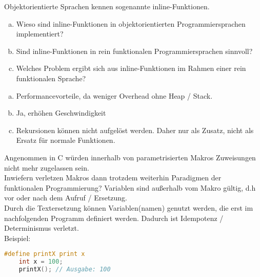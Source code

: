 \begin{card}
	Objektorientierte Sprachen kennen sogenannte inline-Funktionen.
	\begin{enumerate}[a)]
	\item Wieso sind inline-Funktionen in objektorientierten Programmiersprachen implementiert?
	\item Sind inline-Funktionen in rein funktionalen Programmiersprachen sinnvoll?
	\item Welches Problem ergibt sich aus inline-Funktionen im Rahmen einer rein funktionalen Sprache?
	\end{enumerate}
	\hr
	\begin{enumerate}[a)]
	\item Performancevorteile, da weniger Overhead ohne Heap / Stack.
	\item Ja, erhöhen Geschwindigkeit
	\item Rekursionen können nicht aufgelöst werden. Daher nur als Zusatz, nicht als Ersatz für normale Funktionen.
	\end{enumerate}
\end{card}

\begin{card}
	Angenommen in C würden innerhalb von parametrisierten Makros Zuweisungen nicht mehr	zugelassen sein.\\
	Inwiefern verletzen Makros dann trotzdem weiterhin Paradigmen der funktionalen Programmierung?
	\hr
	Variablen sind außerhalb vom Makro gültig, d.h vor oder nach dem Aufruf / Ersetzung.\\
	Durch die Textersetzung können Variablen(namen) genutzt werden, die erst im nachfolgenden Programm definiert werden. Dadurch ist Idempotenz / Determinismus verletzt.\\
	Beispiel:
	\begin{lstlisting}[language=C]
	#define printX print x
	int x = 100;
	printX(); // Ausgabe: 100
	\end{lstlisting}
\end{card}